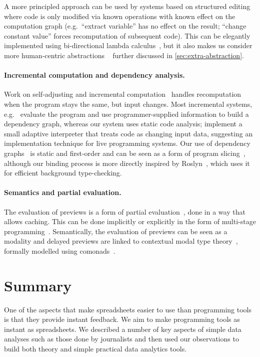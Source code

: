 \documentclass[english,crc,references=cleveref]{programming}
\theoremstyle{plain}
\theoremstyle{definition}
\begin{document}
A more principled approach can be used by systems based on structured editing~\cite{structure-based,interactive,livenut,lamdu}
where code is only modified via known operations with known effect on the computation graph
(e.\hairspace g.~``extract variable'' has no effect on the result; ``change constant value''
forces recomputation of subsequent code). This can be elegantly implemented using bi-directional
lambda calculus~\cite{hazelnut}, but it also makes us consider more human-centric abstractions%
~\cite{subtext,directprog} further discussed in \cref{sec:extra-abstraction}.

\paragraph{Incremental computation and dependency analysis.}
Work on self-adjusting and incremental computation~\cite{selfadjusting,adapton} handles
recomputation when the program stays the same, but input changes.
Most incremental systems, e.\hairspace g.~\cite{incremental,adaptivefp,deltaml} evaluate the program and use
programmer-supplied information to build a dependency graph, whereas our system uses static code analysis;%
\cite{adapton} implement a small adaptive interpreter
that treats code as changing input data, suggesting an implementation technique for
live programming systems. Our use of dependency graphs~\cite{dependencies} is static and first-order
and can be seen as a form of program slicing~\cite{slicing}, although our binding process is
more directly inspired by Roslyn~\cite{roslyn}, which uses it for efficient background type-checking.

\paragraph{Semantics and partial evaluation.}
The evaluation of previews is a form of partial evaluation~\cite{partial}, done in a
way that allows caching. This can be done implicitly or explicitly in the form of
multi-stage programming~\cite{metaml}. Semantically, the evaluation of previews can be seen as a
modality and delayed previews are linked to contextual modal type theory~\cite{cmtt},
formally modelled using comonads~\cite{cmtt-denotation}.



%
\section{Summary}
One of the aspects that make spreadsheets easier to use than programming tools is that they
provide instant feedback. We aim to make programming tools as instant as spreadsheets.
We described a number of key aspects of simple data analyses such as those done by journalists
and then used our observations to build both theory and simple practical data analytics tools.
\end{document}
